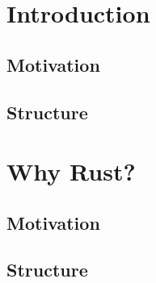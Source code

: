 \documentclass[11pt]{report}
\begin{document}
    
    \thispagestyle{empty}\newpage

    
    \thispagestyle{empty}\newpage

    \tableofcontents\thispagestyle{empty}\newpage


    \setcounter{page}{1}
    \chapter{Introduction}
    \blindtext
    \section{Motivation}
    \blindtext

    \section{Structure}

    \chapter{Why Rust?}
    \blindtext
    \section{Motivation}
    \blindtext

    \section{Structure}
    \newpage


    \newpage\null\thispagestyle{empty}\newpage
    

    \newpage\null\thispagestyle{empty}\newpage
    
\end{document}

